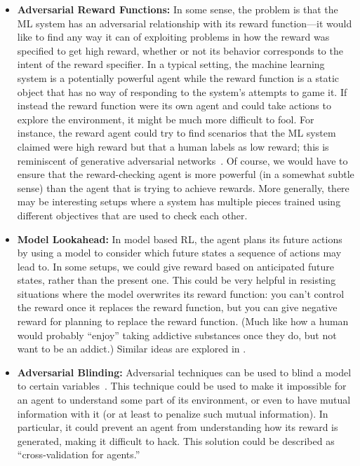 \documentclass[a4paper,10pt]{article}
\begin{document}
\begin{itemize}
\item {\bf Adversarial Reward Functions:} In some sense, the problem is that the ML system has an adversarial relationship with its reward function---it would like to find any way it can of exploiting problems in how the reward was specified to get high reward, whether or not its behavior corresponds to the intent of the reward specifier. In a typical setting, the machine learning system is a potentially powerful agent while the reward function is a static object that has no way of responding to the system's attempts to game it. If instead the reward function were its own agent and could take actions to explore the environment, it might be much more difficult to fool. For instance, the reward agent could try to find scenarios that the ML system claimed were high reward but that a human labels as low reward; this is reminiscent of generative adversarial networks~\cite{goodfellow2014generative}.  Of course, we would have to ensure that the reward-checking agent is more powerful (in a somewhat subtle sense) than the agent that is trying to achieve rewards.  More generally, there may be interesting setups where a system has multiple pieces trained using different objectives that are used to check each other.

\item {\bf Model Lookahead:} In model based RL, the agent plans its future actions by using a model to consider which future states a sequence of actions may lead to. In some setups, we could give reward based on anticipated future states, rather than the present one. This could be very helpful in resisting situations where the model overwrites its reward function: you can’t control the reward once it replaces the reward function, but you can give negative reward for planning to replace the reward function. (Much like how a human would probably ``enjoy'' taking addictive substances once they do, but not want to be an addict.)  Similar ideas are explored in \cite{everitt2016self,hibbard2012model}.

\item {\bf Adversarial Blinding:} Adversarial techniques can be used to blind a model to certain variables~\cite{ajakan2014domain}. This technique could be used to make it impossible for an agent to understand some part of its environment, or even to have mutual information with it (or at least to penalize such mutual information).  In particular, it could prevent an agent from understanding how its reward is generated, making it difficult to hack.  This solution could be described as ``cross-validation for agents.''  


\end{itemize}
\end{document}
